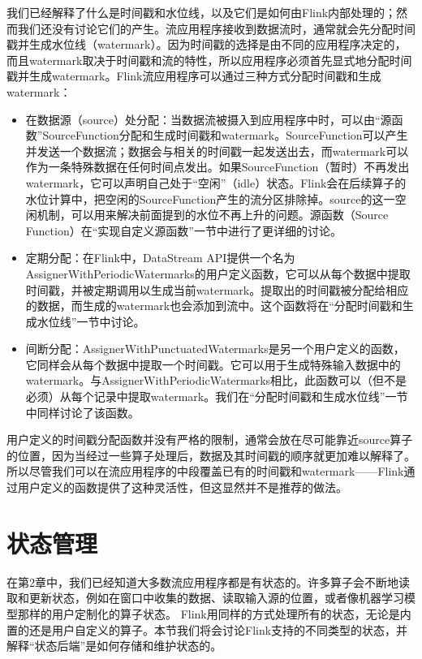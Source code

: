 \documentclass[cn,11pt,chinese]{elegantbook}
\providecommand{\tightlist}{%
  \setlength{\itemsep}{0pt}\setlength{\parskip}{0pt}}
\begin{document}
我们已经解释了什么是时间戳和水位线，以及它们是如何由Flink内部处理的；然而我们还没有讨论它们的产生。流应用程序接收到数据流时，通常就会先分配时间戳并生成水位线（watermark）。因为时间戳的选择是由不同的应用程序决定的，而且watermark取决于时间戳和流的特性，所以应用程序必须首先显式地分配时间戳并生成watermark。Flink流应用程序可以通过三种方式分配时间戳和生成watermark：

\begin{itemize}
\tightlist
\item
  在数据源（source）处分配：当数据流被摄入到应用程序中时，可以由``源函数''SourceFunction分配和生成时间戳和watermark。SourceFunction可以产生并发送一个数据流；数据会与相关的时间戳一起发送出去，而watermark可以作为一条特殊数据在任何时间点发出。如果SourceFunction（暂时）不再发出watermark，它可以声明自己处于``空闲''（idle）状态。Flink会在后续算子的水位计算中，把空闲的SourceFunction产生的流分区排除掉。source的这一空闲机制，可以用来解决前面提到的水位不再上升的问题。源函数（Source
  Function）在``实现自定义源函数''一节中进行了更详细的讨论。
\item
  定期分配：在Flink中，DataStream
  API提供一个名为AssignerWithPeriodicWatermarks的用户定义函数，它可以从每个数据中提取时间戳，并被定期调用以生成当前watermark。提取出的时间戳被分配给相应的数据，而生成的watermark也会添加到流中。这个函数将在``分配时间戳和生成水位线''一节中讨论。
\item
  间断分配：AssignerWithPunctuatedWatermarks是另一个用户定义的函数，它同样会从每个数据中提取一个时间戳。它可以用于生成特殊输入数据中的watermark。与AssignerWithPeriodicWatermarks相比，此函数可以（但不是必须）从每个记录中提取watermark。我们在``分配时间戳和生成水位线''一节中同样讨论了该函数。
\end{itemize}

用户定义的时间戳分配函数并没有严格的限制，通常会放在尽可能靠近source算子的位置，因为当经过一些算子处理后，数据及其时间戳的顺序就更加难以解释了。所以尽管我们可以在流应用程序的中段覆盖已有的时间戳和watermark------Flink通过用户定义的函数提供了这种灵活性，但这显然并不是推荐的做法。

\hypertarget{ux72b6ux6001ux7ba1ux7406}{%
\section{状态管理}\label{ux72b6ux6001ux7ba1ux7406}}

在第2章中，我们已经知道大多数流应用程序都是有状态的。许多算子会不断地读取和更新状态，例如在窗口中收集的数据、读取输入源的位置，或者像机器学习模型那样的用户定制化的算子状态。
Flink用同样的方式处理所有的状态，无论是内置的还是用户自定义的算子。本节我们将会讨论Flink支持的不同类型的状态，并解释``状态后端''是如何存储和维护状态的。
\end{document}
